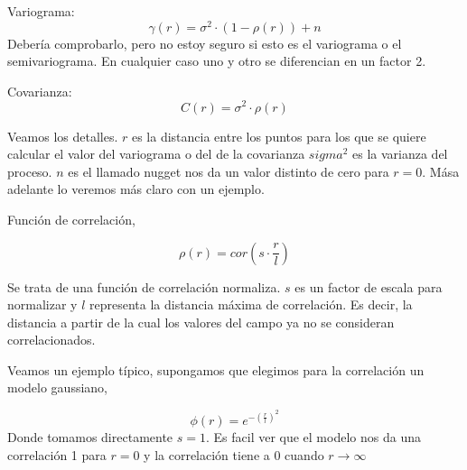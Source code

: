\documentclass[10pt,a4paper]{report}
\begin{document}
Variograma:
\begin{equation}
	\gamma(r) = \sigma^2\cdot(1-\rho(r)) + n
\end{equation}
 Debería comprobarlo, pero no estoy seguro si esto es el variograma o el semivariograma. En cualquier caso uno y otro se diferencian en un factor 2.
 
 Covarianza:
 \begin{equation}
 	C(r) = \sigma^2\cdot \rho(r) 	
 \end{equation}
 
 Veamos los detalles. $r$ es la distancia entre los puntos para los que se quiere calcular el valor del variograma o del de la covarianza $sigma^2$ es la varianza del proceso. $n$ es el llamado nugget nos da un valor distinto de cero para $r=0$. Mása adelante lo veremos más claro con un ejemplo.
 
 Función de correlación,
 
 \begin{equation}
 	\rho(r) = cor(s\cdot\frac{r}{l})
 \end{equation} 
 
Se trata de una función de correlación normaliza. $s$ es un factor de escala para normalizar y $l$ representa la distancia máxima de correlación. Es decir, la distancia a partir de la cual los valores del campo ya no se consideran correlacionados.

Veamos un ejemplo típico, supongamos que elegimos para la correlación un modelo gaussiano,

\begin{equation}
	\phi(r) = e^{-(\frac{r}{l})^2}
\end{equation}
Donde tomamos directamente $s=1$. Es facil ver que el modelo nos da una correlación 1 para $r=0$ y la correlación tiene a 0 cuando $r\to \infty$ 
 	
\end{document}
